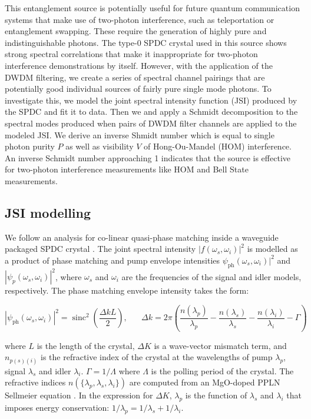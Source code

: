 \documentclass[11pt]{caltech_thesis} %
\begin{document}
This entanglement source is potentially useful for future quantum communication systems that make use of two-photon interference, such as teleportation or entanglement swapping. These require the generation of highly pure and indistinguishable photons. The type-0 SPDC crystal used in this source shows strong spectral correlations that make it inappropriate for two-photon interference demonstrations by itself. However, with the application of the DWDM filtering, we create a series of spectral channel pairings that are potentially good individual sources of fairly pure single mode photons. To investigate this, we model the joint spectral intensity function (JSI) produced by the SPDC and fit it to data. Then we and apply a Schmidt decomposition to the spectral modes produced when pairs of DWDM filter channels are applied to the modeled JSI. We derive an inverse Shmidt number which is equal to single photon purity $P$ as well as visibility $V$ of Hong-Ou-Mandel (HOM) interference. An inverse Schmidt number approaching 1 indicates that the source is effective for two-photon interference measurements like HOM and Bell State measurements.

\hypertarget{jsi-modelling}{%
\subsection{JSI modelling}\label{jsi-modelling}}

We follow an analysis for co-linear quasi-phase matching inside a waveguide packaged SPDC crystal \autocite{Davis2022,ZielnickiKwiat2018SPDCmodel}. The joint spectral intensity $|f(\omega_s, \omega_i)|^2$ is modelled as a product of phase matching and pump envelope intensities \textbar{}$\psi_{\mathrm{ph}}\left(\omega_s, \omega_i\right)|^2$ and $|\psi_p\left(\omega_s, \omega_i\right)|^2$, where $\omega_s$ and $\omega_i$ are the frequencies of the signal and idler models, respectively. The phase matching envelope intensity takes the form:

$$
\left|\psi_{\mathrm{ph}}\left(\omega_s, \omega_i\right)\right|^2=\operatorname{sinc}^2\left(\frac{\Delta k L}{2}\right),\;\;\;\;\;\; \Delta k=2 \pi\left(\frac{n\left(\lambda_p\right)}{\lambda_p}-\frac{n\left(\lambda_s\right)}{\lambda_s}-\frac{n\left(\lambda_i\right)}{\lambda_i}-\Gamma\right)
$$

where $L$ is the length of the crystal, $\Delta K$ is a wave-vector mismatch term, and $n_{p(s)(i)}$ is the refractive index of the crystal at the wavelengths of pump $\lambda_p$, signal $\lambda_s$ and idler $\lambda_i$. $\Gamma = 1/\Lambda$ where $\Lambda$ is the polling period of the crystal. The refractive indices $n(\{\lambda_p, \lambda_s, \lambda_i\})$ are computed from an MgO-doped PPLN Sellmeier equation \autocite{Gayer2008}. In the expression for $\Delta K$, $\lambda_p$ is the function of $\lambda_s$ and $\lambda_i$ that imposes energy conservation: $1/\lambda_p = 1/\lambda_s + 1/\lambda_i$.
\end{document}
